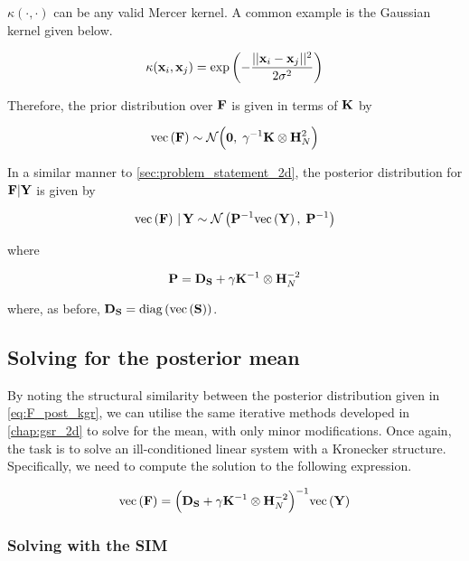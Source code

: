 $\kappa(\cdot, \cdot)$ can be any valid Mercer kernel. A common example is the Gaussian kernel given below. 

\begin{equation}
    \kappa(\mathbf{x}_i, \mathbf{x}_j) = \exp\left(-\frac{|| \mathbf{x}_i - \mathbf{x}_j ||^2}{2 \sigma^2}\right)
\end{equation}

Therefore, the prior distribution over $\mathbf{F}$ is given in terms of $\mathbf{K}$ by 

\begin{equation}
    \label{eq:F_prior3}
    \text{\textup{vec}}\left(\mathbf{F}\right) \sim \mathcal{N}\Big(\mathbf{0}, \; \gamma^{-1} \mathbf{K} \otimes \mathbf{H}_N^{2}\Big)
\end{equation}

In a similar manner to \cref{sec:problem_statement_2d}, the posterior distribution for $\mathbf{F} | \mathbf{Y}$ is given by 

\begin{equation}
    \label{eq:F_post_kgr}
    \text{\textup{vec}}\left(\mathbf{F}\right) \, | \, \mathbf{Y} \sim \mathcal{N}\left(\mathbf{P}^{-1}\text{\textup{vec}}\left(\mathbf{Y}\right), \; \mathbf{P}^{-1}\right)
\end{equation}

where

\begin{equation}
    \mathbf{P} = \mathbf{D}_{\mathbf{S}} + \gamma \mathbf{K}^{-1} \otimes \mathbf{H}_N^{-2}
\end{equation}

where, as before, $\mathbf{D}_{\mathbf{S}} = \text{\textup{diag}}\left(\text{\textup{vec}}\left(\mathbf{S}\right)\right)$. 

\subsection{Solving for the posterior mean}

By noting the structural similarity between the posterior distribution given in \cref{eq:F_post_kgr}, we can utilise the same iterative methods developed in \cref{chap:gsr_2d} to solve for the mean, with only minor modifications. Once again, the task is to solve an ill-conditioned linear system with a Kronecker structure. Specifically, we need to compute the solution to the following expression. 

\begin{equation}
    \label{eq:lin_system_kgr}
    \text{\textup{vec}}\left(\mathbf{F}\right) = \Big(\mathbf{D}_{\mathbf{S}} + \gamma \mathbf{K}^{-1} \otimes \mathbf{H}_N^{-2}\Big)^{-1} \text{\textup{vec}}\left(\mathbf{Y}\right)
\end{equation}

\subsubsection{Solving with the SIM}

